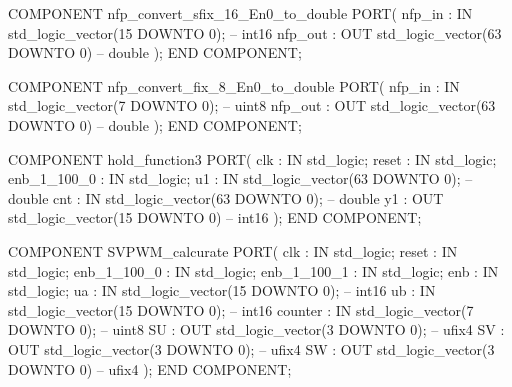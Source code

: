\begin{mylisting}[language=VHDL,caption=MSSRDCDB制御\&SVPWMモジュール,label=appF_Control_top2_module_VHDL]
  COMPONENT nfp_convert_sfix_16_En0_to_double
    PORT( nfp_in                          :   IN    std_logic_vector(15 DOWNTO 0);  -- int16
          nfp_out                         :   OUT   std_logic_vector(63 DOWNTO 0)  -- double
          );
  END COMPONENT;

  COMPONENT nfp_convert_fix_8_En0_to_double
    PORT( nfp_in                          :   IN    std_logic_vector(7 DOWNTO 0);  -- uint8
          nfp_out                         :   OUT   std_logic_vector(63 DOWNTO 0)  -- double
          );
  END COMPONENT;

  COMPONENT hold_function3
    PORT( clk                             :   IN    std_logic;
          reset                           :   IN    std_logic;
          enb_1_100_0                     :   IN    std_logic;
          u1                              :   IN    std_logic_vector(63 DOWNTO 0);  -- double
          cnt                             :   IN    std_logic_vector(63 DOWNTO 0);  -- double
          y1                              :   OUT   std_logic_vector(15 DOWNTO 0)  -- int16
          );
  END COMPONENT;

  COMPONENT SVPWM_calcurate
    PORT( clk                             :   IN    std_logic;
          reset                           :   IN    std_logic;
          enb_1_100_0                     :   IN    std_logic;
          enb_1_100_1                     :   IN    std_logic;
          enb                             :   IN    std_logic;
          ua                              :   IN    std_logic_vector(15 DOWNTO 0);  -- int16
          ub                              :   IN    std_logic_vector(15 DOWNTO 0);  -- int16
          counter                         :   IN    std_logic_vector(7 DOWNTO 0);  -- uint8
          SU                              :   OUT   std_logic_vector(3 DOWNTO 0);  -- ufix4
          SV                              :   OUT   std_logic_vector(3 DOWNTO 0);  -- ufix4
          SW                              :   OUT   std_logic_vector(3 DOWNTO 0)  -- ufix4
          );
  END COMPONENT;


\end{mylisting}
